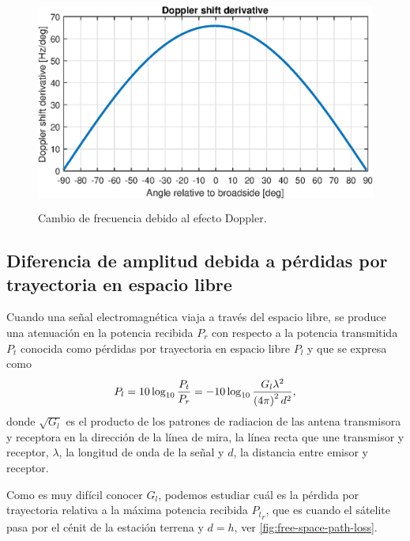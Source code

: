 \documentclass{article}
\newenvironment{standalone}{\begin{preview}}{\end{preview}}
\begin{document}
\begin{standalone}
  \begin{figure}[!htbp]
    \centering
    \includegraphics[width=\linewidth, height=70mm, keepaspectratio]{../images/doppler-shift-derivative.eps}
    \caption{Cambio de frecuencia debido al efecto Doppler.}
    \label{fig:doppler-shift-derivative}
  \end{figure}

  \subsection{Diferencia de amplitud debida a pérdidas por trayectoria en espacio libre}


  Cuando una señal electromagnética viaja a través del espacio libre, se produce una atenuación en la potencia recibida $P_r$ con respecto a la potencia transmitida $P_t$ conocida como pérdidas por trayectoria en espacio libre $P_l$ y que se expresa como \cite[29]{goldsmith2004}
  \begin{equation}
    P_l = 10 \log_{10}{ \frac{P_t}{P_r} } = -10 \log_{10}{ \frac{G_l \lambda^2}{\left( 4\pi \right)^2 d^2} },
    \tagaddtext{[\si{\decibel}]}
  \end{equation}
  donde $\sqrt{G_l}$ es el producto de los patrones de radiacion de las antena transmisora y receptora en la dirección de la línea de mira, la línea recta que une transmisor y receptor, $\lambda$, la longitud de onda de la señal y $d$, la distancia entre emisor y receptor.

  Como es muy difícil conocer $G_l$, podemos estudiar cuál es la pérdida por trayectoria relativa a la máxima potencia recibida ${P_l}_r$, que es cuando el sátelite pasa por el cénit de la estación terrena y $d = h$, ver \cref{fig:free-space-path-loss}.


\end{standalone}
\end{document}
